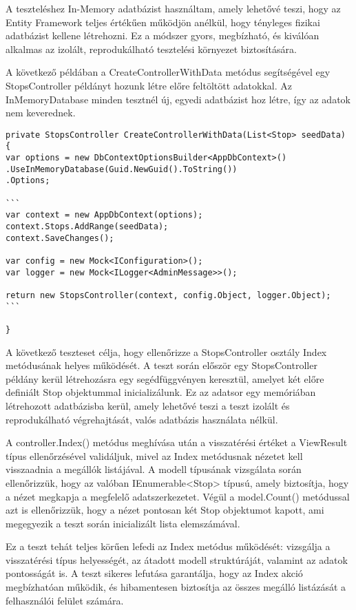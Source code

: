 A teszteléshez In-Memory adatbázist használtam, amely lehetővé teszi, hogy az Entity Framework teljes értékűen működjön anélkül, hogy tényleges fizikai adatbázist kellene létrehozni. Ez a módszer gyors, megbízható, és kiválóan alkalmas az izolált, reprodukálható tesztelési környezet biztosítására.

A következő példában a CreateControllerWithData metódus segítségével egy StopsController példányt hozunk létre előre feltöltött adatokkal. Az InMemoryDatabase minden tesztnél új, egyedi adatbázist hoz létre, így az adatok nem keverednek.

\begin{lstlisting}
private StopsController CreateControllerWithData(List<Stop> seedData)
{
var options = new DbContextOptionsBuilder<AppDbContext>()
.UseInMemoryDatabase(Guid.NewGuid().ToString())
.Options;

```
var context = new AppDbContext(options);
context.Stops.AddRange(seedData);
context.SaveChanges();

var config = new Mock<IConfiguration>();
var logger = new Mock<ILogger<AdminMessage>>();

return new StopsController(context, config.Object, logger.Object);
```

}
\end{lstlisting}


A következő teszteset célja, hogy ellenőrizze a StopsController osztály Index metódusának helyes működését. A teszt során először egy StopsController példány kerül létrehozásra egy segédfüggvényen keresztül, amelyet két előre definiált Stop objektummal inicializálunk. Ez az adatsor egy memóriában létrehozott adatbázisba kerül, amely lehetővé teszi a teszt izolált és reprodukálható végrehajtását, valós adatbázis használata nélkül.

A controller.Index() metódus meghívása után a visszatérési értéket a ViewResult típus ellenőrzésével validáljuk, mivel az Index metódusnak nézetet kell visszaadnia a megállók listájával. A modell típusának vizsgálata során ellenőrizzük, hogy az valóban IEnumerable<Stop> típusú, amely biztosítja, hogy a nézet megkapja a megfelelő adatszerkezetet. Végül a model.Count() metódussal azt is ellenőrizzük, hogy a nézet pontosan két Stop objektumot kapott, ami megegyezik a teszt során inicializált lista elemszámával.

Ez a teszt tehát teljes körűen lefedi az Index metódus működését: vizsgálja a visszatérési típus helyességét, az átadott modell struktúráját, valamint az adatok pontosságát is. A teszt sikeres lefutása garantálja, hogy az Index akció megbízhatóan működik, és hibamentesen biztosítja az összes megálló listázását a felhasználói felület számára.

